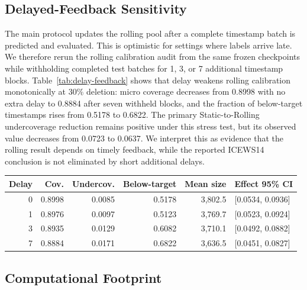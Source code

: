 \documentclass[10pt,twocolumn]{article}
\begin{document}
\subsection{Delayed-Feedback Sensitivity}

The main protocol updates the rolling pool after a complete timestamp batch is
predicted and evaluated. This is optimistic for settings where labels arrive
late. We therefore rerun the rolling calibration audit from the same frozen
checkpoints while withholding completed test batches for 1, 3, or 7 additional
timestamp blocks. Table~\ref{tab:delay-feedback} shows that delay weakens
rolling calibration monotonically at 30\% deletion: micro coverage decreases
from 0.8998 with no extra delay to 0.8884 after seven withheld blocks, and the
fraction of below-target timestamps rises from 0.5178 to 0.6822. The primary
Static-to-Rolling undercoverage reduction remains positive under this stress
test, but its observed value decreases from 0.0723 to 0.0637. We interpret this
as evidence that the rolling result depends on timely feedback, while the
reported ICEWS14 conclusion is not eliminated by short additional delays.

\begin{center}
\captionsetup{type=table}
\centering
{}
\label{tab:delay-feedback}
\scriptsize
\setlength{\tabcolsep}{2pt}
\begin{tabular}{@{}rrrrrl@{}}
\toprule
Delay & Cov. & Undercov. & Below-target & Mean size & Effect 95\% CI\\
\midrule
0 & 0.8998 & 0.0085 & 0.5178 & 3,802.5 & [0.0534, 0.0936]\\
1 & 0.8976 & 0.0097 & 0.5123 & 3,769.7 & [0.0523, 0.0924]\\
3 & 0.8935 & 0.0129 & 0.6082 & 3,710.1 & [0.0492, 0.0882]\\
7 & 0.8884 & 0.0171 & 0.6822 & 3,636.5 & [0.0451, 0.0827]\\
\bottomrule
\end{tabular}
\end{center}

\subsection{Computational Footprint}
\end{document}
